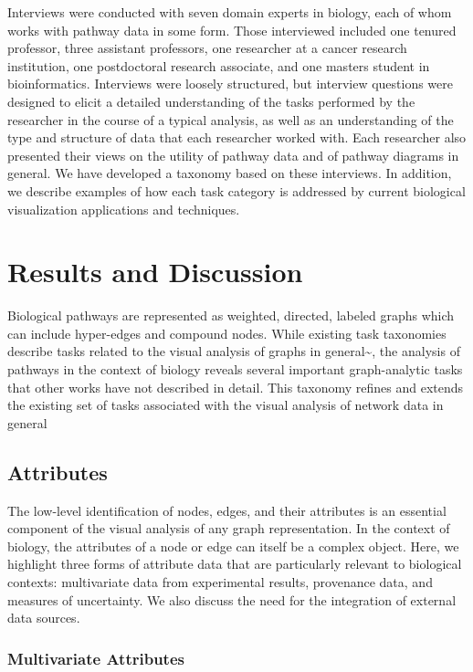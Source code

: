 Interviews were conducted with seven domain experts in biology, each of
whom works with pathway data in some form. Those interviewed included
one tenured professor, three assistant professors, one researcher at a
cancer research institution, one postdoctoral research associate, and
one masters student in bioinformatics. Interviews were loosely
structured, but interview questions were designed to elicit a detailed
understanding of the tasks performed by the researcher in the course of
a typical analysis, as well as an understanding of the type and
structure of data that each researcher worked with. Each researcher also
presented their views on the utility of pathway data and of pathway
diagrams in general. We have developed a taxonomy based on these
interviews. In addition, we describe examples of how each task category
is addressed by current biological visualization applications and
techniques.

\section*{Results and Discussion}

Biological pathways are represented as weighted, directed, labeled
graphs which can include hyper-edges and compound nodes. While existing
task taxonomies describe tasks related to the visual analysis of graphs
in general\textasciitilde{}\cite{Ahn2014, Pretorius2014}, the analysis
of pathways in the context of biology reveals several important
graph-analytic tasks that other works have not described in detail. This
taxonomy refines and extends the existing set of tasks associated with
the visual analysis of network data in general

\subsection*{Attributes}

The low-level identification of nodes, edges, and their attributes is an
essential component of the visual analysis of any graph representation.
In the context of biology, the attributes of a node or edge can itself
be a complex object. Here, we highlight three forms of attribute data
that are particularly relevant to biological contexts: multivariate data
from experimental results, provenance data, and measures of uncertainty.
We also discuss the need for the integration of external data sources.

\subsubsection*{Multivariate Attributes}

